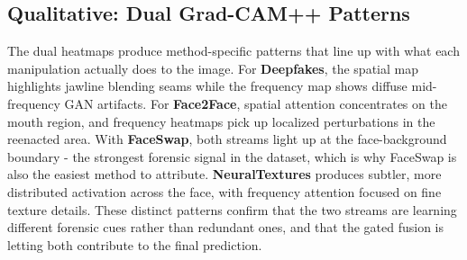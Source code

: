 \subsection{Qualitative: Dual Grad-CAM++ Patterns}
\label{sec:qualitative}

The dual heatmaps produce method-specific patterns that line up with what each manipulation actually does to the image. For \textbf{Deepfakes}, the spatial map highlights jawline blending seams while the frequency map shows diffuse mid-frequency GAN artifacts. For \textbf{Face2Face}, spatial attention concentrates on the mouth region, and frequency heatmaps pick up localized perturbations in the reenacted area. With \textbf{FaceSwap}, both streams light up at the face-background boundary - the strongest forensic signal in the dataset, which is why FaceSwap is also the easiest method to attribute. \textbf{NeuralTextures} produces subtler, more distributed activation across the face, with frequency attention focused on fine texture details. These distinct patterns confirm that the two streams are learning different forensic cues rather than redundant ones, and that the gated fusion is letting both contribute to the final prediction.
